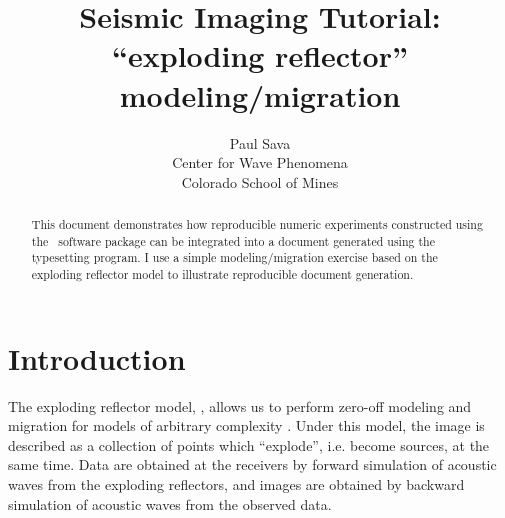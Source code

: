 

\author{Paul Sava \\ Center for Wave Phenomena \\ Colorado School of Mines}
\title{Seismic Imaging Tutorial: \\
  ``exploding reflector'' modeling/migration}
\maketitle

\begin{abstract}
This document demonstrates how reproducible numeric experiments
constructed using the \mg~software package can be integrated into a
document generated using the \latex typesetting program. I use a
simple modeling/migration exercise based on the exploding reflector
model to illustrate reproducible document generation.
\end{abstract}

\section{Introduction}

The exploding reflector model, , allows us to perform
zero-off modeling and migration for models of arbitrary complexity
\cite[]{Claerbout.iei.1985} . Under this model, the image is described
as a collection of points which ``explode'', i.e. become sources, at
the same time. Data are obtained at the receivers by forward
simulation of acoustic waves from the exploding reflectors, and images
are obtained by backward simulation of acoustic waves from the
observed data.


